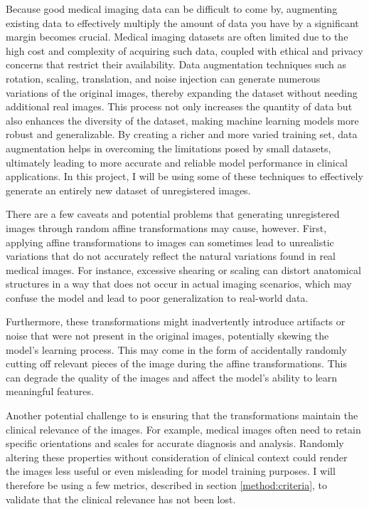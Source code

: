 Because good medical imaging data can be difficult to come by, augmenting existing data to effectively multiply the amount of data you have by a significant margin becomes crucial. Medical imaging datasets are often limited due to the high cost and complexity of acquiring such data, coupled with ethical and privacy concerns that restrict their availability. Data augmentation techniques such as rotation, scaling, translation, and noise injection can generate numerous variations of the original images, thereby expanding the dataset without needing additional real images. This process not only increases the quantity of data but also enhances the diversity of the dataset, making machine learning models more robust and generalizable. By creating a richer and more varied training set, data augmentation helps in overcoming the limitations posed by small datasets, ultimately leading to more accurate and reliable model performance in clinical applications. In this project, I will be using some of these techniques to effectively generate an entirely new dataset of unregistered images.

There are a few caveats and potential problems that generating unregistered images through random affine transformations may cause, however. First, applying affine transformations to images can sometimes lead to unrealistic variations that do not accurately reflect the natural variations found in real medical images. For instance, excessive shearing or scaling can distort anatomical structures in a way that does not occur in actual imaging scenarios, which may confuse the model and lead to poor generalization to real-world data.

Furthermore, these transformations might inadvertently introduce artifacts or noise that were not present in the original images, potentially skewing the model’s learning process. This may come in the form of accidentally randomly cutting off relevant pieces of the image during the affine transformations. This can degrade the quality of the images and affect the model's ability to learn meaningful features.

Another potential challenge to is ensuring that the transformations maintain the clinical relevance of the images. For example, medical images often need to retain specific orientations and scales for accurate diagnosis and analysis. Randomly altering these properties without consideration of clinical context could render the images less useful or even misleading for model training purposes. I will therefore be using a few metrics, described in section \ref{method:criteria}, to validate that the clinical relevance has not been lost.


